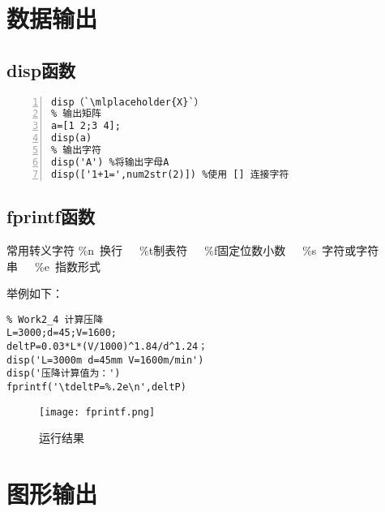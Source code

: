 \section{数据输出}
\subsection{disp函数}
\begin{lstlisting}[frame=single,numbers=left]
%显示`\mlplaceholder{X}`到屏幕，并自动换行
disp（`\mlplaceholder{X}`）
% 输出矩阵
a=[1 2;3 4];
disp(a)
% 输出字符
disp('A') %将输出字母A
disp(['1+1=',num2str(2)]) %使用 [] 连接字符
\end{lstlisting}

\subsection{fprintf函数}

\begin{definition}{常用转义字符}{}
\%n~换行~~~\%t制表符~~~\%f固定位数小数~~~\%s~字符或字符串~~~\%e~指数形式
\end{definition}
举例如下：
\begin{lstlisting}
% Work2_4 计算压降
L=3000;d=45;V=1600;
deltP=0.03*L*(V/1000)^1.84/d^1.24；
disp('L=3000m d=45mm V=1600m/min')
disp('压降计算值为：')
fprintf('\tdeltP=%.2e\n',deltP)
\end{lstlisting}
\begin{figure}[htbp]
	\centering
	\texttt{[image: fprintf.png]}
	\caption{运行结果}
\end{figure}
\newpage
\section{图形输出}
